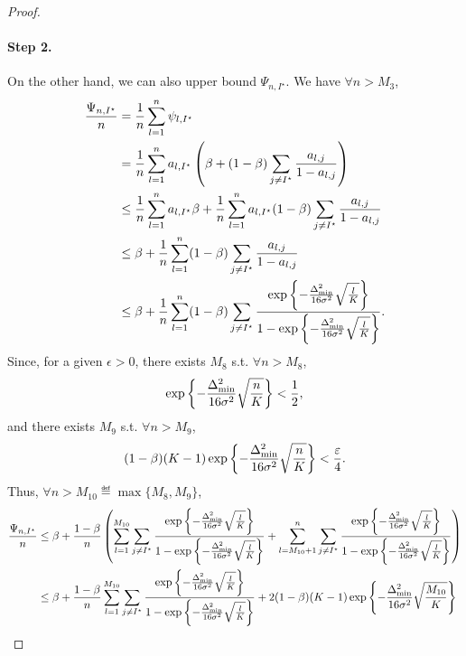 \begin{proof}
    \paragraph{Step 2.} On the other hand, we can also upper bound $\Psi_{n,I^\star}$. We have $\forall n > M_3$,
    \begin{align*}
        \frac{\Psi_{n,I^\star}}{n} &= \frac{1}{n}\sum_{l=1}^{n}\psi_{l,I^\star}\\
                             &= \frac{1}{n}\sum_{l=1}^{n}a_{l,I^\star}\left( \beta + (1-\beta)\sum_{j\neq I^\star}\frac{a_{l,j}}{1-a_{l,j}} \right)\\
                             &\leq \frac{1}{n}\sum_{l=1}^{n}a_{l,I^\star}\beta + \frac{1}{n}\sum_{l=1}^{n}a_{l,I^\star}(1-\beta)\sum_{j\neq I^\star}\frac{a_{l,j}}{1-a_{l,j}}\\
                             &\leq \beta + \frac{1}{n}\sum_{l=1}^{n}(1-\beta)\sum_{j\neq I^\star}\frac{a_{l,j}}{1-a_{l,j}}\\
                             &\leq \beta + \frac{1}{n}\sum_{l=1}^{n}(1-\beta)\sum_{j\neq I^\star}\frac{\exp\left\{-\frac{\Delta_{\text{min}}^2}{16\sigma^2}\sqrt{\frac{l}{K}}\right\}}{1-\exp\left\{-\frac{\Delta_{\text{min}}^2}{16\sigma^2}\sqrt{\frac{l}{K}}\right\}}.
    \end{align*}
    Since, for a given $\epsilon > 0$, there exists $M_8$ s.t. $\forall n > M_8$,
    \[
        \exp\left\{-\frac{\Delta_{\text{min}}^2}{16\sigma^2}\sqrt{\frac{n}{K}}\right\} < \frac{1}{2},
    \]
    and there exists $M_9$ s.t. $\forall n > M_9$,
    \[
        (1-\beta)(K-1)\exp\left\{-\frac{\Delta_{\text{min}}^2}{16\sigma^2}\sqrt{\frac{n}{K}}\right\} < \frac{\varepsilon}{4}.
    \]
    Thus, $\forall n > M_{10} \eqdef \max\{M_8,M_9\}$,
    \begin{align*}
        \frac{\Psi_{n,I^\star}}{n} &\leq \beta + \frac{1-\beta}{n}\left(\sum_{l=1}^{M_{10}}\sum_{j\neq I^\star}\frac{\expp{-\frac{\Delta_{\text{min}}^2}{16\sigma^2}\sqrt{\frac{l}{K}}}}{1-\expp{-\frac{\Delta_{\text{min}}^2}{16\sigma^2}\sqrt{\frac{l}{K}}}} + \sum_{l=M_{10}+1}^{n}\sum_{j\neq I^\star}\frac{\expp{-\frac{\Delta_{\text{min}}^2}{16\sigma^2}\sqrt{\frac{l}{K}}}}{1-\expp{-\frac{\Delta_{\text{min}}^2}{16\sigma^2}\sqrt{\frac{l}{K}}}}\right)\\
                             &\leq \beta + \frac{1-\beta}{n}\sum_{l=1}^{M_{10}}\sum_{j\neq I^\star}\frac{\expp{-\frac{\Delta_{\text{min}}^2}{16\sigma^2}\sqrt{\frac{l}{K}}}}{1-\expp{-\frac{\Delta_{\text{min}}^2}{16\sigma^2}\sqrt{\frac{l}{K}}}} + 2(1-\beta)(K-1)\expp{-\frac{\Delta_{\text{min}}^2}{16\sigma^2}\sqrt{\frac{M_{10}}{K}}}\\

\end{align*}
\end{proof}
